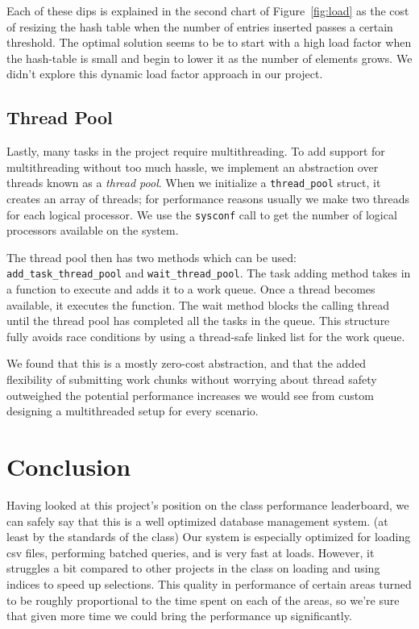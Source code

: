 \documentclass[a4paper, 12pt]{article}
\begin{document}
 \medskip
 Each of these dips is explained in the second chart of Figure~\ref{fig:load} as the cost of resizing the hash table when the number of entries inserted passes a certain threshold. The optimal solution seems to be to start with a high load factor when the hash-table is small and begin to lower it as the number of elements grows. We didn't explore this dynamic load factor approach in our project.

\subsection{Thread Pool}
\label{threadpool}

Lastly, many tasks in the project require multithreading. To add support for multithreading without too much hassle, we implement an abstraction over threads known as a \textit{thread pool}. When we initialize a \texttt{thread\_pool} struct, it creates an array of threads; for performance reasons usually we make two threads for each logical processor. We use the \texttt{sysconf} call to get the number of logical processors available on the system.

\medskip
The thread pool then has two methods which can be used: \texttt{add\_task\_thread\_pool} and \texttt{wait\_thread\_pool}. The task adding method takes in a function to execute and adds it to a work queue. Once a thread becomes available, it executes the function. The wait method blocks the calling thread until the thread pool has completed all the tasks in the queue. This structure fully avoids race conditions by using a thread-safe linked list for the work queue. 

\medskip
We found that this is a mostly zero-cost abstraction, and that the added flexibility of submitting work chunks without worrying about thread safety outweighed the potential performance increases we would see from custom designing a multithreaded setup for every scenario.

\section{Conclusion}

Having looked at this project's position on the class performance leaderboard, we can safely say that this is a well optimized database management system. (at least by the standards of the class) Our system is especially optimized for loading csv files, performing batched queries, and is very fast at loads. However, it struggles a bit compared to other projects in the class on loading and using indices to speed up selections. This quality in performance of certain areas turned to be roughly proportional to the time spent on each of the areas, so we're sure that given more time we could bring the performance up significantly.
\end{document}
